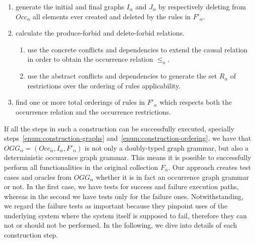 \begin{definition}
\begin{enumerate}
\item\label{enum:construction-graphs} generate the initial and final graphs $I_\alpha$ and $J_\alpha$ by respectively deleting from $Occ_\alpha$ all elements ever created and deleted by the rules in $F'_\alpha$.

\item\label{enum:construction-occurrence} calculate the produce-forbid and delete-forbid relations.

\begin{enumerate}
\item\label{enum:construction-analysis} use the concrete conflicts and dependencies to extend the causal relation in order to obtain the occurrence relation $\leq_o$.

\item\label{enum:construction-restriction} use the abstract conflicts and dependencies to generate the set $R_\alpha$ of restrictions over the ordering of rules applicability.
\end{enumerate}

\item\label{enum:construction-ordering} find one or more total orderings of rules in $F'_\alpha$ which respects both the occurrence relation and the occurrence restrictions.
\end{enumerate}

\end{definition}

If all the steps in such a construction can be successfully executed, specially steps~\ref{enum:construction-graphs} and~\ref{enum:construction-ordering}, we have that $OGG_\alpha = (Occ_\alpha, I_\alpha, F'_\alpha)$ is not only a doubly-typed graph grammar, but also a deterministic occurrence graph grammar. This means it is possible to successfully perform all functionalities in the original collection $F_\alpha$. Our approach creates test cases and oracles from $OGG_\alpha$ whether it is in
fact an occurrence graph grammar or not. In the first case, we have tests for success and failure execution paths, whereas in the second we have tests only for the failure ones. Notwithstanding, we regard the failure tests as important because they pinpoint uses of the underlying system where the system itself is supposed to fail, therefore they can not or should not be performed. In the following, we dive into details of each construction step.

